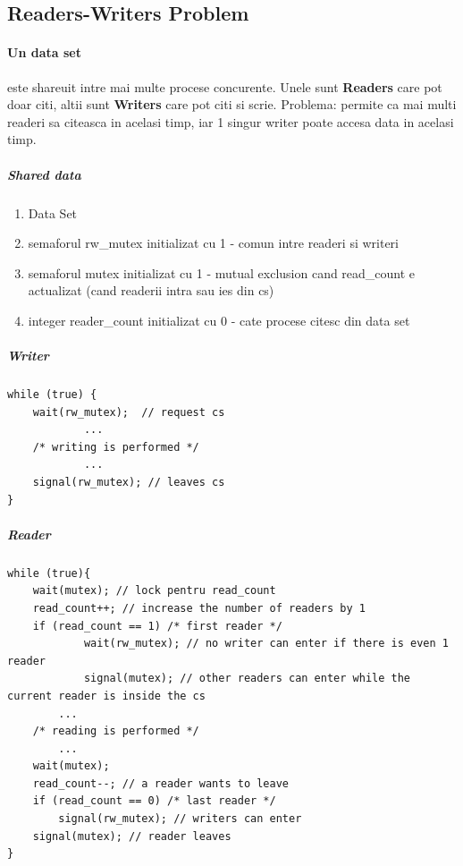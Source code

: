 \documentclass{article}
\begin{document}
\subsection*{Readers-Writers Problem}
\paragraph*{Un data set} este shareuit intre mai multe procese concurente. Unele sunt \textbf{Readers} care pot doar citi, altii sunt \textbf{Writers} care pot citi si scrie. Problema: permite ca mai multi readeri sa citeasca in acelasi timp, iar 1 singur writer poate accesa data in acelasi timp. 

\subparagraph*{Shared data}
\begin{enumerate}
    \item Data Set
    \item semaforul rw\_mutex initializat cu 1 - comun intre readeri si writeri
    \item semaforul mutex initializat cu 1 - mutual exclusion cand read\_count e actualizat (cand readerii intra sau ies din cs)
    \item integer reader\_count initializat cu 0 - cate procese citesc din data set
\end{enumerate}

\subparagraph*{Writer}
\begin{center}
    \begin{lstlisting}
while (true) {
    wait(rw_mutex);  // request cs
            ...
    /* writing is performed */ 
            ... 
    signal(rw_mutex); // leaves cs
}
    \end{lstlisting}
\end{center}

\subparagraph*{Reader}
\begin{center}
    \begin{lstlisting}
while (true){
    wait(mutex); // lock pentru read_count
    read_count++; // increase the number of readers by 1
    if (read_count == 1) /* first reader */ 
            wait(rw_mutex); // no writer can enter if there is even 1 reader
            signal(mutex); // other readers can enter while the current reader is inside the cs
        ...
    /* reading is performed */ 
        ... 
    wait(mutex);
    read_count--; // a reader wants to leave
    if (read_count == 0) /* last reader */
        signal(rw_mutex); // writers can enter
    signal(mutex); // reader leaves
}
    \end{lstlisting}
\end{center}
\end{document}
